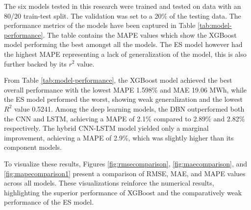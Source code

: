The six models tested in this research were trained and tested on data with an 80/20 train-test split. The validation was set to a 20\% of the testing data. The performance metrics of the models have been captured in Table \ref{tab:model-performance}. The table contains the MAPE values which show the XGBoost model performing the best amongst all the models. The ES model however had the highest MAPE representing a lack of generalization of the model, this is also further backed by its $r^2$ value.
\begin{table}[htbp]
 	\centering
 	\small
 	\caption{Performance comparison of forecasting models}
 	\label{tab:model-performance}
 	
 \end{table}
 From Table \ref{tab:model-performance}, the XGBoost model achieved the best overall performance with the lowest MAPE 1.598\% and MAE 19.06 MWh, while the ES model performed the worst, showing weak generalization and the lowest $R^2$ value 0.5241. Among the deep learning models, the DBN outperformed both the CNN and LSTM, achieving a MAPE of 2.1\% compared to 2.89\% and 2.82\% respectively. The hybrid CNN-LSTM model yielded only a marginal improvement, achieving a MAPE of 2.9\%, which was slightly higher than its component models.
 
 To visualize these results, Figures \ref{fig:rmsecomparison}, \ref{fig:maecomparison}, and \ref{fig:mapecomparison1} present a comparison of RMSE, MAE, and MAPE values across all models. These visualizations reinforce the numerical results, highlighting the superior performance of XGBoost and the comparatively weak performance of the ES model.
 
